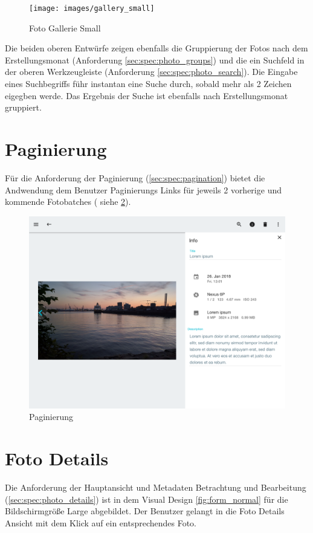 \begin{figure}[htp]     %
\centering
\texttt{[image: images/gallery\_small]} 
\caption{Foto Gallerie Small}\label{fig:gallery_small}
\end{figure}

Die beiden oberen Entwürfe zeigen ebenfalls die Gruppierung der Fotos nach dem Erstellungsmonat (Anforderung \ref{sec:spec:photo_groups}) und die ein Suchfeld in der oberen Werkzeugleiste (Anforderung \ref{sec:spec:photo_search}). Die Eingabe eines Suchbegriffs führ instantan eine Suche durch, sobald mehr als 2 Zeichen eigegben werde. Das Ergebnis der Suche ist ebenfalls nach Erstellungsmonat gruppiert.

\section{Paginierung}

Für die Anforderung der Paginierung (\ref{sec:spec:pagination}) bietet die Andwendung dem Benutzer Paginierungs Links für jeweils 2 vorherige und kommende Fotobatches ( siehe \ref{fig:pagination}).

\begin{figure}[htp]     %
\centering
\includegraphics[width=1.0\textwidth]{images/form_normal} 
\caption{Paginierung}\label{fig:pagination}
\end{figure}

\section{Foto Details}
Die Anforderung der Hauptansicht und Metadaten Betrachtung und Bearbeitung (\ref{sec:spec:photo_details}) ist in dem Visual Design  \ref{fig:form_normal} für die Bildschirmgröße Large abgebildet. Der Benutzer gelangt in die Foto Details Ansicht mit dem Klick auf ein entsprechendes Foto. 

